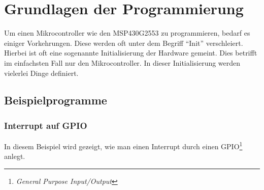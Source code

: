 \section{Grundlagen der Programmierung}
Um einen Mikrocontroller wie den MSP430G2553 zu programmieren, bedarf es
einiger Vorkehrungen. Diese werden oft unter dem Begriff ``Init'' 
verschleiert. Hierbei ist oft eine sogenannte Initialisierung der 
Hardware gemeint. Dies betrifft im einfachsten Fall nur den Mikrocontroller.
In dieser Initialisierung werden vielerlei Dinge definiert.

\begin{comment}
	Im folgenden wird eine solche Initialisierung vorgestellt samt C- 
	und Header-File.

	\subsection{Hardwareinitialisierung}
	
	
\end{comment}

\subsection{Beispielprogramme}

\subsubsection{Interrupt auf GPIO}
In diesem Beispiel wird gezeigt, wie man einen Interrupt durch einen
GPIO\footnote{\emph{General Purpose Input/Output}} anlegt.


